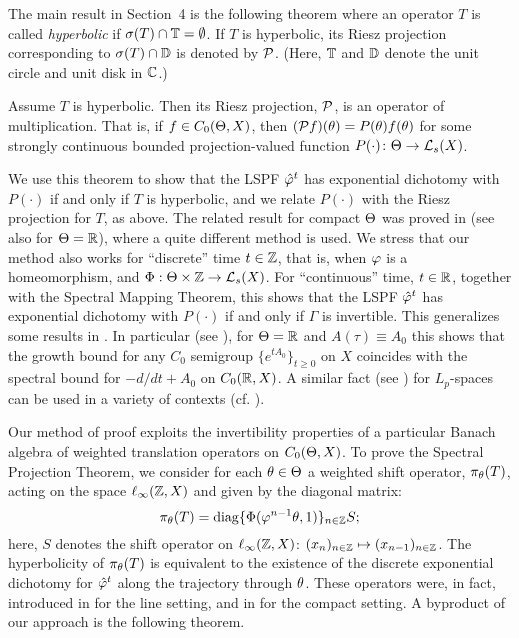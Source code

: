 The main result in Section~4 is the following theorem where
 an operator $T$ is called {\em hyperbolic} if
$\sigma(T)\cap{\Bbb{T}}=\emptyset$. If $T$ is hyperbolic,
its Riesz projection corresponding to
$\sigma(T)\cap{\Bbb{D}}$ is denoted by ${\cal{P}}$.
(Here, ${\Bbb{T}}$ and ${\Bbb{D}}$ denote the unit circle and unit disk in
${\Bbb{C}}$.)

\begin{introSPT}
Assume $T$ is hyperbolic.
Then its Riesz projection, ${\cal{P}}$, is an operator of
multiplication. That is, if $f\in C_0(\Theta,X)$, then $({\cal{P}}
f)(\theta)=P(\theta)f(\theta)$ for some strongly continuous bounded
projection-valued function $P(\cdot)\colon \Theta\to {\cal{L}}_s(X)$.
\end{introSPT}

We use this theorem to show that the LSPF ${\hat{\varphi}}^t$ has exponential
dichotomy with $P(\cdot)$ if and only if $T$ is hyperbolic, and we
relate $P(\cdot)$ with the Riesz projection for $T$, as above.
The related result for compact $\Theta$ was proved in \cite{Rau} (see
also \cite{Rab,Rau1,Rau2} for $\Theta={\Bbb{R}}$), where a quite
different method is used.  We stress that our method also
works for ``discrete'' time $t\in{\Bbb{Z}}$, that is, when $\varphi$
is a homeomorphism, and $\Phi:\Theta\times{\Bbb{Z}}\to {\cal{L}}_s(X)$. For
``continuous'' time, $t\in{\Bbb{R}}$, together with the Spectral Mapping
Theorem, this shows that the LSPF ${\hat{\varphi}}^t$ has exponential dichotomy
with $P(\cdot)$ if and only if $\Gamma$ is invertible. This
generalizes some results in \cite{Gohb,Palm}. In particular (see
\cite{LMS1,LMS2}), for $\Theta={\Bbb{R}}$ and $A(\tau)\equiv A_0$ this shows
that the growth bound for any $C_0$ semigroup $\{e^{tA_0}\}_{t\ge0}$
on $X$ coincides with the spectral bound for $-d/dt+A_0$ on
$C_0({\Bbb{R}},X)$. A similar fact (see \cite{LMS1})
for $L_p$-spaces can be used in a
variety of contexts (cf. \cite{Mont,We}).

Our method of proof exploits the invertibility properties of a
particular Banach algebra of weighted translation operators on $C_0(\Theta,X)$.
To prove the Spectral Projection Theorem, we consider for each $\theta\in
\Theta$ a weighted shift  operator, $\pi_\theta(T)$, acting  on the space
$\ell_\infty({\Bbb{Z}},X)$ and given by the diagonal matrix:
\[ \pi_\theta(T)=\operatorname{diag} \{\Phi(\varphi^{n-1}\theta,1)\}_{n\in{\Bbb{Z}}}S;\]
here, $S$ denotes the shift operator on $\ell_\infty({\Bbb{Z}},X)$:
$(x_n)_{n\in{\Bbb{Z}}}\mapsto (x_{n-1})_{n\in{\Bbb{Z}}}$.
The hyperbolicity of $\pi_\theta(T)$ is equivalent to
the existence of the discrete exponential dichotomy for ${\hat{\varphi}}^t$ along
the trajectory through $\theta$. These operators were, in fact, introduced
in \cite{Henry} for the line setting, and in
\cite{Ant,ChLe1,LS} for the
 compact setting.  A byproduct of our approach is the
following theorem.


